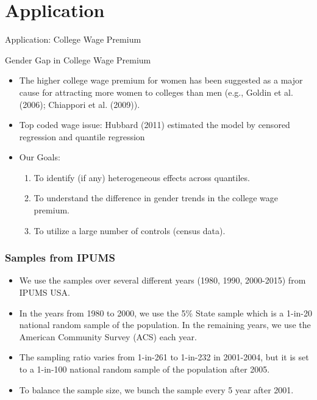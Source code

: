 \documentclass[beamer, t]{beamer}
\newcommand{\bit}{\begin{itemize}}
\newcommand{\eit}{\end{itemize}}
\begin{document}
\section{Application}

\begin{frame}
	\vfill
	\centering
	\LARGE{Application: College Wage Premium}
	\vfill
\end{frame}

\begin{frame}{Gender Gap in College Wage Premium}
	
	\begin{itemize}
		\item The higher college wage premium for women has been suggested as a major cause for attracting more women to colleges than men (e.g., Goldin et al. (2006); Chiappori et al. (2009)).
		
		\item Top coded wage issue: Hubbard (2011) estimated the model by censored regression and quantile regression
		
		\item Our Goals:
		
		\begin{enumerate}
			\item To identify (if any) heterogeneous effects across quantiles.

			\item To understand the difference in gender trends in the college wage premium.

			\item To utilize a large number of controls (census data).
			
			
			
			
		\end{enumerate}
		
	\end{itemize}


\end{frame}

\begin{frame}
\frametitle{Samples from IPUMS}
	\bit
		\item We use the samples over several different years (1980, 1990, 2000-2015) from IPUMS USA.
		
		\item
		In the years from 1980 to 2000, we use the 5\% State sample which is a 1-in-20 national random sample of the population. 
		In the remaining years, we use the American Community Survey (ACS) each year. 
		
		\item The sampling ratio varies from 1-in-261 to 1-in-232 in 2001-2004, but it is set to a 1-in-100 national random sample of the population after 2005. 
		
		\item
		To balance the sample size, we bunch the sample every 5 year after 2001. 		
	\eit
\end{frame}
\end{document}
